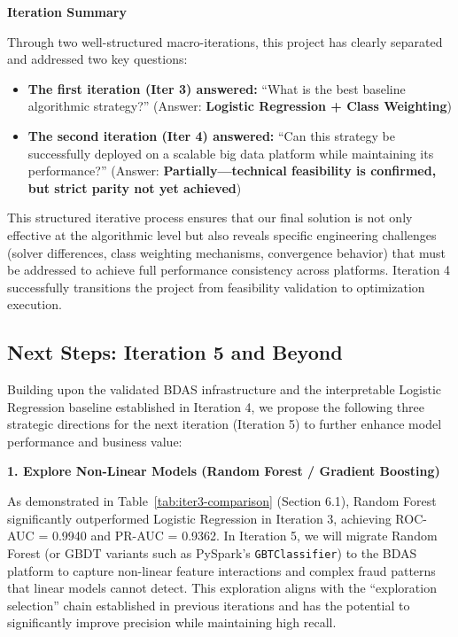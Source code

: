 \documentclass[sigplan,screen]{acmart}
\begin{document}
\textbf{Iteration Summary}

Through two well-structured macro-iterations, this project has clearly separated and addressed two key questions:

\begin{itemize}
\item \textbf{The first iteration (Iter 3) answered:} ``What is the best baseline algorithmic strategy?'' (Answer: \textbf{Logistic Regression + Class Weighting})
\item \textbf{The second iteration (Iter 4) answered:} ``Can this strategy be successfully deployed on a scalable big data platform while maintaining its performance?'' (Answer: \textbf{Partially—technical feasibility is confirmed, but strict parity not yet achieved})
\end{itemize}

This structured iterative process ensures that our final solution is not only effective at the algorithmic level but also reveals specific engineering challenges (solver differences, class weighting mechanisms, convergence behavior) that must be addressed to achieve full performance consistency across platforms. Iteration 4 successfully transitions the project from feasibility validation to optimization execution.

\subsection{Next Steps: Iteration 5 and Beyond}

Building upon the validated BDAS infrastructure and the interpretable Logistic Regression baseline established in Iteration 4, we propose the following three strategic directions for the next iteration (Iteration 5) to further enhance model performance and business value:

\textbf{1. Explore Non-Linear Models (Random Forest / Gradient Boosting)}

As demonstrated in Table~\ref{tab:iter3-comparison} (Section 6.1), Random Forest significantly outperformed Logistic Regression in Iteration 3, achieving ROC-AUC = 0.9940 and PR-AUC = 0.9362. In Iteration 5, we will migrate Random Forest (or GBDT variants such as PySpark's \texttt{GBTClassifier}) to the BDAS platform to capture non-linear feature interactions and complex fraud patterns that linear models cannot detect. This exploration aligns with the ``exploration \textrightarrow{} selection'' chain established in previous iterations and has the potential to significantly improve precision while maintaining high recall.
\end{document}
